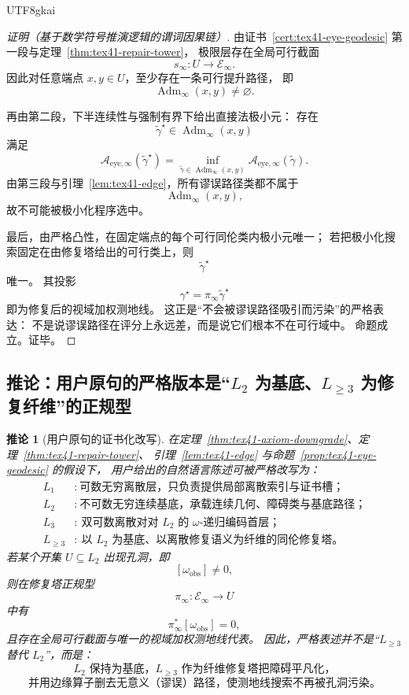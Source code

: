 \documentclass[12pt]{article}
\newtheorem{corollary}{推论}[section]
\newcommand{\Adm}{\operatorname{Adm}}
\begin{document}
\begin{CJK*}{UTF8}{gkai}
\begin{proof}[证明（基于数学符号推演逻辑的谓词因果链）]
由证书~\ref{cert:tex41-eye-geodesic} 第一段与定理~\ref{thm:tex41-repair-tower}，
极限层存在全局可行截面
\[
  s_\infty:U\to\mathcal E_\infty.
\]
因此对任意端点 $x,y\in U$，至少存在一条可行提升路径，
即
\[
  \Adm_\infty(x,y)\neq\varnothing.
\]

再由第二段，下半连续性与强制有界下给出直接法极小元：
存在
\[
  \widetilde\gamma^\star\in\Adm_\infty(x,y)
\]
满足
\[
  \mathcal A_{\mathrm{eye},\infty}(\widetilde\gamma^\star)
  =
  \inf_{\widetilde\gamma\in\Adm_\infty(x,y)}
  \mathcal A_{\mathrm{eye},\infty}(\widetilde\gamma).
\]
由第三段与引理~\ref{lem:tex41-edge}，所有谬误路径类都不属于
\[
  \Adm_\infty(x,y),
\]
故不可能被极小化程序选中。

最后，由严格凸性，在固定端点的每个可行同伦类内极小元唯一；
若把极小化搜索固定在由修复塔给出的可行类上，则
\[
  \widetilde\gamma^\star
\]
唯一。
其投影
\[
  \gamma^\star=\pi_\infty\widetilde\gamma^\star
\]
即为修复后的视域加权测地线。
这正是“不会被谬误路径吸引而污染”的严格表达：
不是说谬误路径在评分上永远差，而是说它们根本不在可行域中。
命题成立。证毕。
\end{proof}

\subsection{推论：用户原句的严格版本是“$L_2$ 为基底、$L_{\ge 3}$ 为修复纤维”的正规型}
\label{subsec:tex41-ch1-corollary}

\begin{corollary}[用户原句的证书化改写]
\label{cor:tex41-main}
在定理~\ref{thm:tex41-axiom-downgrade}、定理~\ref{thm:tex41-repair-tower}、
引理~\ref{lem:tex41-edge} 与命题~\ref{prop:tex41-eye-geodesic} 的假设下，
用户给出的自然语言陈述可被严格改写为：
\[
\boxed{
\begin{aligned}
  L_1&:\ \text{可数无穷离散层，只负责提供局部离散索引与证书槽；}\\
  L_2&:\ \text{不可数无穷连续基底，承载连续几何、障碍类与基底路径；}\\
  L_3&:\ \text{双可数离散对对 $L_2$ 的 $\omega$-递归编码首层；}\\
  L_{\ge 3}&:\ \text{以 $L_2$ 为基底、以离散修复语义为纤维的同伦修复塔。}
\end{aligned}
}
\]
若某个开集 $U\subseteq L_2$ 出现孔洞，即
\[
  [\omega_{\mathrm{obs}}]\neq 0,
\]
则在修复塔正规型
\[
  \pi_\infty:\mathcal E_\infty\to U
\]
中有
\[
  \pi_\infty^\ast[\omega_{\mathrm{obs}}]=0,
\]
且存在全局可行截面与唯一的视域加权测地线代表。
因此，严格表述并不是“$L_{\ge 3}$ 替代 $L_2$”，而是：
\[
  \text{$L_2$ 保持为基底，$L_{\ge 3}$ 作为纤维修复塔把障碍平凡化，}
\]
\[
  \text{并用边缘算子删去无意义（谬误）路径，使测地线搜索不再被孔洞污染。}
\]
\end{corollary}


\end{CJK*}
\end{document}
